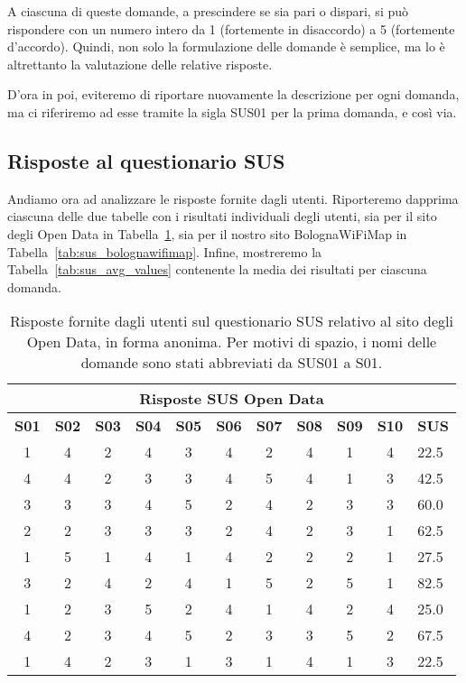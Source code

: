 A ciascuna di queste domande, a prescindere se sia pari o dispari, si può rispondere con un numero intero da 1 (fortemente in disaccordo) a 5 (fortemente d'accordo). Quindi, non solo la formulazione delle domande è semplice, ma lo è altrettanto la valutazione delle relative risposte.

D'ora in poi, eviteremo di riportare nuovamente la descrizione per ogni domanda, ma ci riferiremo ad esse tramite la sigla SUS01 per la prima domanda, e così via.

\subsection{Risposte al questionario SUS}
Andiamo ora ad analizzare le risposte fornite dagli utenti. Riporteremo dapprima ciascuna delle due tabelle con i risultati individuali degli utenti, sia per il sito degli Open Data in Tabella~\ref{tab:sus_opendata}, sia per il nostro sito BolognaWiFiMap in Tabella~\ref{tab:sus_bolognawifimap}. Infine, mostreremo la Tabella~\ref{tab:sus_avg_values} contenente la media dei risultati per ciascuna domanda.

\begin{center}
    \begin{table}[H]
        \centering
        \begin{tabularx}{\textwidth}{|c|c|c|c|c|c|c|c|c|c|X|}
            \hline
            \multicolumn{11}{|c|}{\textbf{Risposte SUS Open Data}} \\
            \hline
            \textbf{S01} & \textbf{S02} & \textbf{S03} & \textbf{S04} & \textbf{S05} & \textbf{S06} & \textbf{S07} & \textbf{S08} & \textbf{S09} & \textbf{S10} & \textbf{SUS} \\
            \hline
            1 & 4 & 2 & 4 & 3 & 4 & 2 & 4 & 1 & 4 & 22.5 \\
            4 & 4 & 2 & 3 & 3 & 4 & 5 & 4 & 1 & 3 & 42.5 \\
            3 & 3 & 3 & 4 & 5 & 2 & 4 & 2 & 3 & 3 & 60.0 \\
            2 & 2 & 3 & 3 & 3 & 2 & 4 & 2 & 3 & 1 & 62.5 \\
            1 & 5 & 1 & 4 & 1 & 4 & 2 & 2 & 2 & 1 & 27.5 \\
            3 & 2 & 4 & 2 & 4 & 1 & 5 & 2 & 5 & 1 & 82.5 \\
            1 & 2 & 3 & 5 & 2 & 4 & 1 & 4 & 2 & 4 & 25.0 \\
            4 & 2 & 3 & 4 & 5 & 2 & 3 & 3 & 5 & 2 & 67.5 \\
            1 & 4 & 2 & 3 & 1 & 3 & 1 & 4 & 1 & 3 & 22.5 \\
            \hline
        \end{tabularx}
        \caption[Risposte del questionario SUS sul sito degli Open Data]{Risposte fornite dagli utenti sul questionario SUS relativo al sito degli Open Data, in forma anonima. Per motivi di spazio, i nomi delle domande sono stati abbreviati da SUS01 a S01.}
        \label{tab:sus_opendata}
    \end{table}
\end{center}


